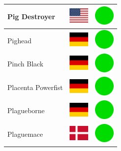 \documentclass[12pt, a4paper, twoside]{report}
\begin{document}
\begin{center}
\begin{longtable}{|p{5cm}|p{2cm}|p{2cm}|}
 Pig Destroyer                                              & \includegraphics[width=1cm]{../img/flags/us} &   \includegraphics[width=1cm]{../likes/y} \\ \hline
 Pighead                                                    & \includegraphics[width=1cm]{../img/flags/de} &   \includegraphics[width=1cm]{../likes/y} \\ \hline
 Pinch Black                                                & \includegraphics[width=1cm]{../img/flags/de} &   \includegraphics[width=1cm]{../likes/y} \\ \hline
 Placenta Powerfist                                         & \includegraphics[width=1cm]{../img/flags/de} &   \includegraphics[width=1cm]{../likes/y} \\ \hline
 Plagueborne                                                & \includegraphics[width=1cm]{../img/flags/de} &   \includegraphics[width=1cm]{../likes/y} \\ \hline
 Plaguemace                                                 & \includegraphics[width=1cm]{../img/flags/dk} &   \includegraphics[width=1cm]{../likes/y} \\ \hline

\end{longtable}
\end{center}
\end{document}
